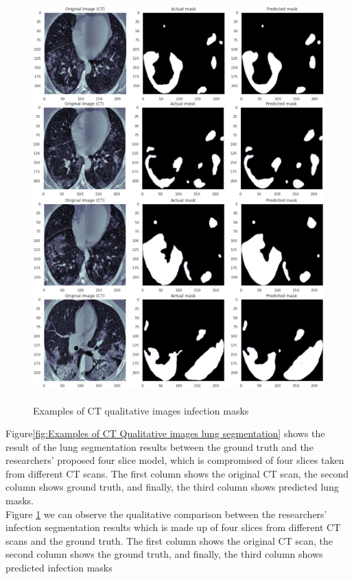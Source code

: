  \begin{figure}[H]
    \centering
    \includegraphics[width=1\textwidth,height=15cm,keepaspectratio]{Images/CTScanQualitativeImage2.png}\\
    \caption{Examples of CT qualitative images infection masks\cite{litReviewDeepLearningCovid19}}
    \label{fig:Examples of CT qualitative images infection masks}
\end{figure}
\vspace{0.5mm}
Figure\ref{fig:Examples of CT Qualitative images lung segmentation} shows the result of the lung segmentation results between the ground truth and the researchers' proposed four slice model, which is compromised of four slices taken from different CT scans.  The first column shows the original CT scan, the second column shows ground truth, and finally, the third column shows predicted lung masks.
\\
Figure \ref{fig:Examples of CT qualitative images infection masks} we can observe the qualitative comparison between the researchers' infection segmentation results which is made up of four slices from different CT scans and the ground truth. The first column shows the original CT scan, the second column shows the ground truth, and finally, the third column shows predicted infection masks
